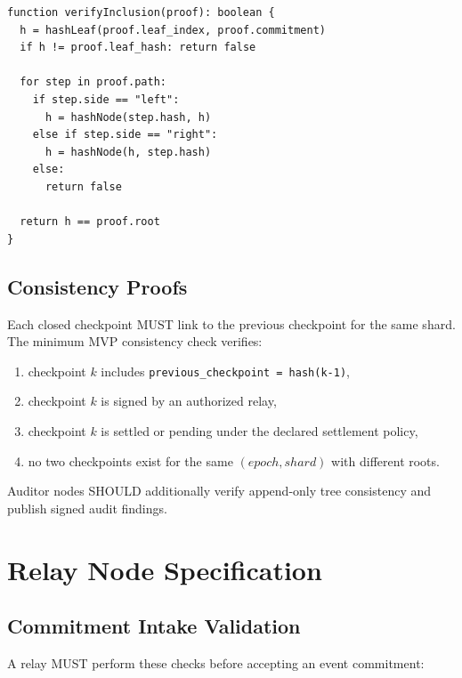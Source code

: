 \documentclass[11pt]{article}
\begin{document}
\begin{lstlisting}[style=tslcode]
function verifyInclusion(proof): boolean {
  h = hashLeaf(proof.leaf_index, proof.commitment)
  if h != proof.leaf_hash: return false

  for step in proof.path:
    if step.side == "left":
      h = hashNode(step.hash, h)
    else if step.side == "right":
      h = hashNode(h, step.hash)
    else:
      return false

  return h == proof.root
}
\end{lstlisting}

\subsection{Consistency Proofs}

Each closed checkpoint MUST link to the previous checkpoint for the same shard. The minimum MVP consistency check verifies:

\begin{enumerate}
    \item checkpoint \(k\) includes \texttt{previous\_checkpoint = hash(k-1)},
    \item checkpoint \(k\) is signed by an authorized relay,
    \item checkpoint \(k\) is settled or pending under the declared settlement policy,
    \item no two checkpoints exist for the same \((epoch, shard)\) with different roots.
\end{enumerate}

Auditor nodes SHOULD additionally verify append-only tree consistency and publish signed audit findings.

\section{Relay Node Specification}

\subsection{Commitment Intake Validation}

A relay MUST perform these checks before accepting an event commitment:
\end{document}

